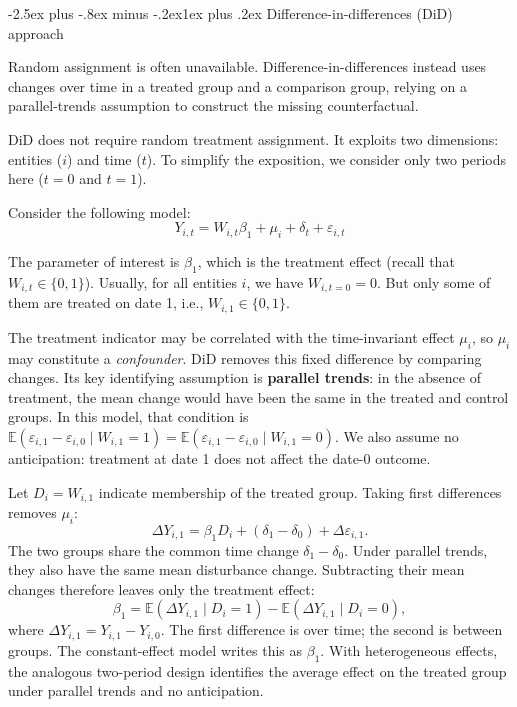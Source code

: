 \documentclass[
  11pt,
]{book}
\makeatletter
\renewcommand\subsection{\@startsection{subsection}{2}{\z@}
  {-2.5ex plus -.8ex minus -.2ex}{1ex plus .2ex}
  {\normalfont\large\bfseries\color{TextbookInk}}}
\theoremstyle{definition}
\theoremstyle{definition}
\theoremstyle{definition}
\theoremstyle{definition}
\theoremstyle{remark}
\makeatother
\begin{document}
\subsection{Difference-in-differences (DiD) approach}\label{did}

Random assignment is often unavailable. Difference-in-differences instead uses changes over time in a treated group and a comparison group, relying on a parallel-trends assumption to construct the missing counterfactual.

DiD does not require random treatment assignment. It exploits two dimensions: entities (\(i\)) and time (\(t\)). To simplify the exposition, we consider only two periods here (\(t=0\) and \(t=1\)).

Consider the following model:
\begin{equation}
Y_{i,t} = W_{i,t} \beta_1 + \mu_i + \delta_t + \varepsilon_{i,t}\label{eq:DiD}
\end{equation}

The parameter of interest is \(\beta_{1}\), which is the treatment effect (recall that \(W_{i,t} \in \{0,1\}\)). Usually, for all entities \(i\), we have \(W_{i,t=0}=0\). But only some of them are treated on date 1, i.e., \(W_{i,1} \in \{0,1\}\).

The treatment indicator may be correlated with the time-invariant effect \(\mu_i\), so \(\mu_i\) may constitute a \emph{confounder}. DiD removes this fixed difference by comparing changes. Its key identifying assumption is \textbf{parallel trends}: in the absence of treatment, the mean change would have been the same in the treated and control groups. In this model, that condition is \(\mathbb{E}(\varepsilon_{i,1}-\varepsilon_{i,0}\mid W_{i,1}=1)=\mathbb{E}(\varepsilon_{i,1}-\varepsilon_{i,0}\mid W_{i,1}=0)\). We also assume no anticipation: treatment at date 1 does not affect the date-0 outcome.

Let \(D_i=W_{i,1}\) indicate membership of the treated group. Taking first differences removes \(\mu_i\):
\[
\Delta Y_{i,1}=\beta_1 D_i+(\delta_1-\delta_0)+\Delta\varepsilon_{i,1}.
\]
The two groups share the common time change \(\delta_1-\delta_0\). Under parallel trends, they also have the same mean disturbance change. Subtracting their mean changes therefore leaves only the treatment effect:
\[
\boxed{\beta_1=\mathbb{E}(\Delta Y_{i,1}\mid D_i=1)
                   -\mathbb{E}(\Delta Y_{i,1}\mid D_i=0),}
\]
where \(\Delta Y_{i,1}=Y_{i,1}-Y_{i,0}\). The first difference is over time; the second is between groups. The constant-effect model writes this as \(\beta_1\). With heterogeneous effects, the analogous two-period design identifies the average effect on the treated group under parallel trends and no anticipation.
\end{document}
